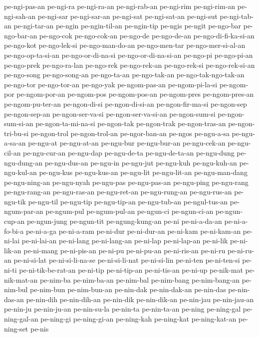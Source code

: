{pe-ngi-pas-an pe-ngi-ra pe-ngi-ra-an pe-ngi-rab-an pe-ngi-rim
pe-ngi-rim-an pe-ngi-sah-an pe-ngi-sar pe-ngi-sar-an pe-ngi-sat
pe-ngi-sat-an pe-ngi-sut pe-ngi-tab-an pe-ngi-tar-an pe-ngin
pe-ngin-til-an pe-ngin-tip pe-ngis pe-ngit pe-ngo-bar pe-ngo-bar-an
pe-ngo-cok pe-ngo-cok-an pe-ngo-de pe-ngo-de-an pe-ngo-di-fi-ka-si-an
pe-ngo-kot pe-ngo-lek-si pe-ngo-man-do-an pe-ngo-men-tar
pe-ngo-mer-si-al-an pe-ngo-op-ta-si-an pe-ngo-or-di-na-si
pe-ngo-or-di-na-si-an pe-ngo-pi pe-ngo-pi-an pe-ngo-prek pe-ngo-ra-lan
pe-ngo-rek pe-ngo-rek-an pe-ngo-rek-si pe-ngo-rek-si-an pe-ngo-song
pe-ngo-song-an pe-ngo-ta-an pe-ngo-tak-an pe-ngo-tak-ngo-tak-an pe-ngo-tor
pe-ngo-tor-an pe-ngo-yak pe-ngom-pas-an pe-ngom-pi-la-si pe-ngom-por
pe-ngom-por-an pe-ngom-pos pe-ngom-pos-an pe-ngom-pres pe-ngom-pres-an
pe-ngom-pu-ter-an pe-ngon-di-si pe-ngon-di-si-an pe-ngon-fir-ma-si
pe-ngon-sep pe-ngon-sep-an pe-ngon-ser-va-si pe-ngon-ser-va-si-an
pe-ngon-sum-si pe-ngon-sum-si-an pe-ngon-ta-mi-na-si pe-ngon-tak
pe-ngon-trak pe-ngon-tras-an pe-ngon-tri-bu-si pe-ngon-trol
pe-ngon-trol-an pe-ngor-ban-an pe-ngos pe-ngu-a-sa pe-ngu-a-sa-an
pe-ngu-at pe-ngu-at-an pe-ngu-bur pe-ngu-bur-an pe-ngu-cek-an
pe-ngu-cil-an pe-ngu-cur-an pe-ngu-dap pe-ngu-de-ta pe-ngu-de-ta-an
pe-ngu-dung pe-ngu-dung-an pe-ngu-dus-an pe-ngu-in pe-ngu-jut pe-ngu-kuh
pe-ngu-kuh-an pe-ngu-kul-an pe-ngu-kus pe-ngu-kus-an pe-ngu-lit
pe-ngu-lit-an pe-ngu-man-dang pe-ngu-ning-an pe-ngu-nyah pe-ngu-pas
pe-ngu-pas-an pe-ngu-ping pe-ngu-rang pe-ngu-rang-an pe-ngu-ras-an
pe-ngu-ret-an pe-ngu-rung-an pe-ngu-rus-an pe-ngu-tik pe-ngu-til
pe-ngu-tip pe-ngu-tip-an pe-ngu-tub-an pe-ngul-tus-an pe-ngum-par-an
pe-ngum-pul pe-ngum-pul-an pe-ngun-ci pe-ngun-ci-an pe-ngun-cup-an
pe-ngun-jung pe-ngun-tit pe-ngung-kung-an pe-ni pe-ni-a-da-an
pe-ni-a-fo-bi-a pe-ni-a-ga pe-ni-a-ram pe-ni-dur pe-ni-dur-an pe-ni-kam
pe-ni-kam-an pe-ni-lai pe-ni-lai-an pe-ni-lang pe-ni-lang-an pe-ni-lap
pe-ni-lap-an pe-ni-lik pe-ni-lik-an pe-ni-mang pe-ni-pis-an pe-ni-pu
pe-ni-pu-an pe-ni-ris-an pe-ni-ru pe-ni-ru-an pe-ni-si-lat
pe-ni-si-li-na-se pe-ni-si-li-nat pe-ni-si-lin pe-ni-ten pe-ni-ten-si
pe-ni-ti pe-ni-tik-be-rat-an pe-ni-tip pe-ni-tip-an pe-ni-tis-an pe-ni-up
pe-nik-mat pe-nik-mat-an pe-nim-ba pe-nim-ba-an pe-nim-bal pe-nim-bang
pe-nim-bang-an pe-nim-bul pe-nim-bun pe-nim-bun-an pe-nin-dak
pe-nin-dak-an pe-nin-das pe-nin-das-an pe-nin-dih pe-nin-dih-an pe-nin-dik
pe-nin-dik-an pe-nin-jau pe-nin-jau-an pe-nin-ju pe-nin-ju-an pe-nin-su-la
pe-nin-ta pe-nin-ta-an pe-ning pe-ning-gal pe-ning-gal-an pe-ning-gi
pe-ning-gi-an pe-ning-kah pe-ning-kat pe-ning-kat-an pe-ning-set pe-nis
}
